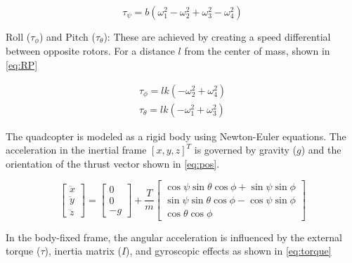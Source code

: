 \begin{equation}\label{eq:Y}
    \tau_\psi = b (\omega_1^2 - \omega_2^2 + \omega_3^2 - \omega_4^2)
\end{equation}

Roll ($\tau_\phi$) and Pitch ($\tau_\theta$): These are achieved by creating a speed differential between opposite rotors. For a distance $l$ from the center of mass, shown in \cref{eq:RP}

\begin{equation}\label{eq:RP}
\begin{gathered}
    \tau_\phi = l k (-\omega_2^2 + \omega_4^2) \\
    \tau_\theta = l k (-\omega_1^2 + \omega_3^2)
\end{gathered}
\end{equation}

The quadcopter is modeled as a rigid body using Newton-Euler equations. The acceleration in the inertial frame ${[x,y,z]}^T$ is governed by gravity ($g$) and the orientation of the thrust vector shown in \cref{eq:pos}.

\begin{equation}\label{eq:pos}
    \begin{bmatrix} 
        \ddot{x} \\
        \ddot{y} \\ 
        \ddot{z} 
    \end{bmatrix} = \begin{bmatrix} 0 \\
                                    0 \\
                                    -g 
                    \end{bmatrix} + \frac{T}{m} \begin{bmatrix} 
                            \cos\psi \sin\theta \cos\phi + \sin\psi \sin\phi \\ \sin\psi \sin\theta \cos\phi - \cos\psi \sin\phi \\ \cos\theta \cos\phi 
                    \end{bmatrix}
\end{equation}

In the body-fixed frame, the angular acceleration is influenced by the external torque ($\tau$), inertia matrix ($I$), and gyroscopic effects as shown in \cref{eq:torque}

